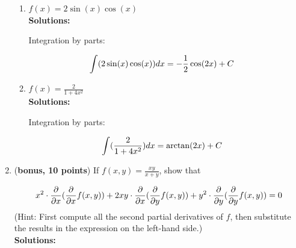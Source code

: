 \documentclass[a4paper]{article}
\begin{document}
\begin{enumerate}
\begin{enumerate}
	
	
	
	\item $f(x) = 2 \sin(x) \cos(x)$\\
	\textbf{Solutions:}	
	
Integration by parts:	
	
\begin{align}
	\int(2 \sin(x) \cos(x))dx &= - \frac{1}{2} \cos(2x) + C\notag
\end{align}		
	
	
	\item $f(x) = \frac{2}{1 + 4x^2}$\\
	\textbf{Solutions:}		
	
Integration by parts:	
	
\begin{align}
	\int(\frac{2}{1 + 4x^2})dx &= \arctan(2x) + C\notag
\end{align}					
	

\end{enumerate}

\item (\textbf{bonus, 10 points}) If $f(x,y) = \frac{xy}{x+y}$, show that

\begin{align}
x^2 \cdot \frac{\partial}{\partial x}(\frac{\partial}{\partial x}f(x,y)) + 2xy \cdot \frac{\partial}{\partial x}(\frac{\partial}{\partial y}f(x,y)) + y^2 \cdot \frac{\partial}{\partial y}(\frac{\partial}{\partial y}f(x,y)) = 0\notag
\end{align}
	(Hint: First compute all the second partial derivatives of $f$, then substitute the results in the expression on the left-hand side.)\\
\textbf{Solutions:}	

\end{enumerate}
\end{document}
